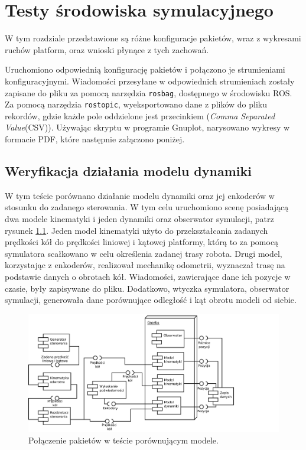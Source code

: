 \chapter{Testy środowiska symulacyjnego}
\label{sec:tests}
W tym rozdziale przedstawione są różne konfiguracje pakietów, wraz z wykresami ruchów platform, oraz wnioski płynące z tych zachowań.

Uruchomiono odpowiednią konfigurację pakietów i połączono je strumieniami konfiguracyjnymi.
Wiadomości przesyłane w odpowiednich strumieniach zostały zapisane do pliku za pomocą narzędzia
\texttt{rosbag}, dostępnego w środowisku ROS.
Za pomocą narzędzia \texttt{rostopic}, wyeksportowano dane z plików do pliku rekordów, gdzie każde pole oddzielone jest przecinkiem (\emph{Comma Separated Value}(CSV)).
Używając skryptu w programie Gnuplot, narysowano wykresy w formacie PDF, które następnie załączono poniżej.

\section{Weryfikacja działania modelu dynamiki}
	W tym teście porównano działanie modelu dynamiki oraz jej enkoderów w stosunku do zadanego sterowania.
	W tym celu uruchomiono scenę posiadającą dwa modele kinematyki i jeden dynamiki oraz obserwator symulacji, patrz rysunek \ref{uml:comparison}.
	Jeden model kinematyki użyto do przekształcania zadanych prędkości kół do prędkości liniowej i kątowej platformy, którą to za pomocą symulatora scałkowano w celu określenia zadanej trasy robota. Drugi model, korzystając z enkoderów, realizował mechanikę odometrii, wyznaczał trasę na podstawie danych o obrotach kół.
	Wiadomości, zawierające dane ich pozycje w czasie, były zapisywane do pliku.
	Dodatkowo, wtyczka symulatora, obserwator symulacji, generowała dane porównujące odległość i kąt obrotu modeli od siebie.
	
	\begin{figure}[h]
		\centering
		\includegraphics[width=\textwidth]{uml/comparison.pdf}
			\caption{Połączenie pakietów w teście porównującym modele.}
		\label{uml:comparison}
	\end{figure}
	
